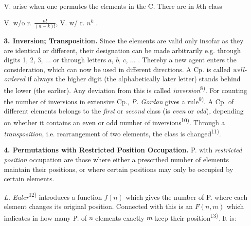 \thispagestyle{fancy}

\vspace{0.5cm}

V. arise when one permutes the elements in the C. There are in $k$th class

\begin{center}
    V. w/o r. \; $ \frac{n!}{(n-k)!}$, \quad \quad V. w/ r. \; $n^k$ .
\end{center}

\textbf{3. Inversion; Transposition.} Since the elements are valid only insofar as they are identical or different, their designation can be made arbitrarily e.g. through digits 1, 2, 3, ... or through letters $a$, $b$, $c$, ... . Thereby a new agent enters the consideration, which can now be used in different directions. A Cp. is called \textit{well-ordered} if always the higher digit (the alphabetically later letter) stands behind the lower (the earlier). Any deviation from this is called \textit{inversion}\textsuperscript{8)}. For counting the number of inversions in extensive Cp., \textit{P. Gordan} gives a rule\textsuperscript{9)}. A Cp. of different elements belongs to the \textit{first} or \textit{second} class (is \textit{even} or \textit{odd}), depending on whether it contains an even or odd number of inversions\textsuperscript{10)}. Through a \textit{transposition}, i.e. rearrangement of two elements, the class is changed\textsuperscript{11)}.

\vspace{0.3cm}

\textbf{4. Permutations with Restricted Position Occupation.} P. with \textit{restricted position} occupation are those where either a prescribed number of elements maintain their positions, or where certain positions may only be occupied by certain elements.

\textit{L. Euler}\textsuperscript{12)} introduces a function $f(n)$ which gives the number of P. where each element changes its original position. Connected with this is an $F(n,m)$ which indicates in how many P. of $n$ elements exactly $m$ keep their position\textsuperscript{13)}. It is:

